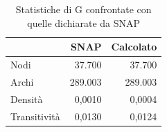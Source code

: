 \begin{table}[H]
\centering
\caption{Statistiche di G confrontate con quelle dichiarate da SNAP}
\label{tab:confronto_snap}
\begin{tabular}{lrr}
\toprule
 & SNAP & Calcolato \\
\midrule
Nodi & 37.700 & 37.700 \\
Archi & 289.003 & 289.003 \\
Densità & 0,0010 & 0,0004 \\
Transitività & 0,0130 & 0,0124 \\
\bottomrule
\end{tabular}
\end{table}
